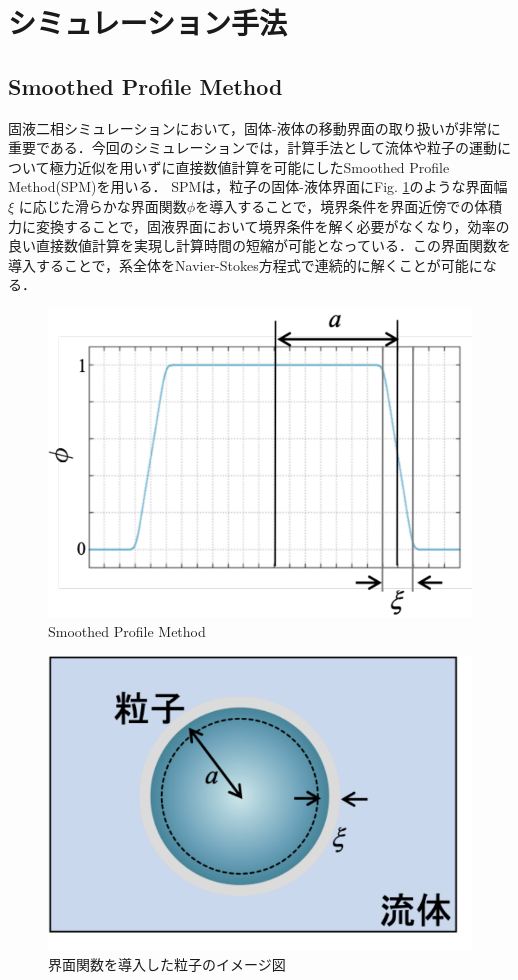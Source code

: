 \section{\large シミュレーション手法}
\subsection{Smoothed Profile Method}
\par 固液二相シミュレーションにおいて，固体-液体の移動界面の取り扱いが非常に重要である．今回のシミュレーションでは，計算手法として流体や粒子の運動について極力近似を用いずに直接数値計算を可能にしたSmoothed Profile Method(SPM)\cite{spm}を用いる．
SPMは，粒子の固体-液体界面にFig. \ref{spm1}のような界面幅$\xi$ に応じた滑らかな界面関数$\phi$を導入することで，境界条件を界面近傍での体積力に変換することで，固液界面において境界条件を解く必要がなくなり，効率の良い直接数値計算を実現し計算時間の短縮が可能となっている．この界面関数を導入することで，系全体をNavier-Stokes方程式で連続的に解くことが可能になる．
\begin{figure}[H]
\centering
\includegraphics[scale = 0.7]{figures/spm1.pdf}
\caption{Smoothed Profile Method}
\label{spm1}
\end{figure}
%
\begin{figure}[H]
\centering
\includegraphics[scale = 0.7]{figures/spm2.pdf}
\caption{界面関数を導入した粒子のイメージ図}
\end{figure}
%	
\newpage
%
